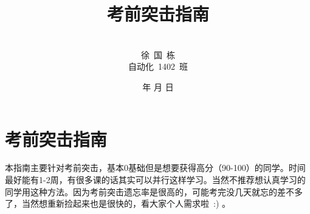 \documentclass[a4paper]{article}
\begin{document}
\renewcommand{\contentsname}{目\ 录}
\renewcommand{\appendixname}{附录}
\renewcommand{\appendixpagename}{附录}
\renewcommand{\refname}{参考文献} 
\renewcommand{\figurename}{图}
\renewcommand{\tablename}{表}
\renewcommand{\today}{\number\year 年 \number\month 月 \number\day 日}

\title{{\Huge 考前突击指南{\large\linebreak\\}}}
\author{\\徐\ 国\ 栋\\
自动化\ 1402\ 班}
\date{\today}
\maketitle
\newpage

\begin{center}
\tableofcontents\label{c}
\end{center}
\newpage



\section{考前突击指南} \label{overview}%
本指南主要针对考前突击，基本0基础但是想要获得高分（90-100）的同学。时间最好能有1-2周，有很多课的话其实可以并行这样学习。当然不推荐想认真学习的同学用这种方法。因为考前突击遗忘率是很高的，可能考完没几天就忘的差不多了，当然想重新捡起来也是很快的，看大家个人需求啦\ :) 。
\end{document}
